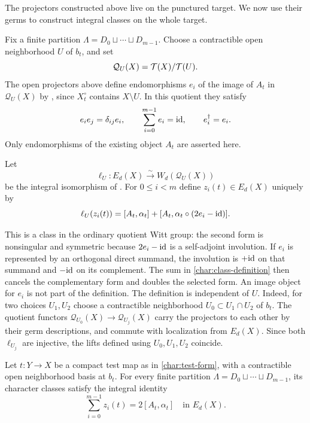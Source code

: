 The projectors constructed above live on the punctured target. We now
use their germs to construct integral classes on the whole target.

Fix a finite partition
$\Lambda=D_0\sqcup\cdots\sqcup D_{m-1}$.
Choose a contractible open neighborhood $U$ of $b_t$, and set
\[
 \mathcal Q_U(X)=\mathcal T(X)/\mathcal T(U).
\]
The open projectors above define endomorphisms $e_i$ of the image of
$A_t$ in $\mathcal Q_U(X)$ by , since
$X_t^\circ$ contains $X\setminus U$.  In this quotient they satisfy
\begin{equation}\label{char:projector-identities}
 e_i e_j=\delta_{ij}e_i,\qquad
 \sum_{i=0}^{m-1}e_i=\mathrm{id},\qquad e_i^\dagger=e_i.
\end{equation}
Only endomorphisms of the existing object $A_t$ are asserted here.

\begin{definition}\label{def:character-classes}
Let
\[
 \ell_U:E_d(X)\xrightarrow{\sim}W_d(\mathcal Q_U(X))
\]
be the integral isomorphism of .
For $0\leq i<m$ define $z_i(t)\in E_d(X)$ uniquely by
\begin{equation}\label{char:class-definition}
 \ell_U(z_i(t))=
 [A_t,\alpha_t]+[A_t,\alpha_t\circ(2e_i-\mathrm{id})].
\end{equation}
\end{definition}

This is a class in the ordinary quotient Witt group: the second form
is nonsingular and symmetric because $2e_i-\mathrm{id}$ is a self-adjoint
involution.  If $e_i$ is represented by an orthogonal direct summand,
the involution is $+\mathrm{id}$ on that summand and $-\mathrm{id}$ on its complement.
The sum in \eqref{char:class-definition} then cancels the complementary
form and doubles the selected form.  An image object for $e_i$ is not
part of the definition.
The definition is independent of $U$.  Indeed, for two choices $U_1,U_2$
choose a contractible neighborhood $U_0\subset U_1\cap U_2$ of $b_t$.
The quotient functors $\mathcal Q_{U_0}(X)\to\mathcal Q_{U_j}(X)$
carry the projectors to each other by their germ descriptions, and
commute with localization from $E_d(X)$.  Since both $\ell_{U_j}$
are injective, the lifts defined using $U_0,U_1,U_2$ coincide.

\begin{proposition}\label{prop:sum-classes}
Let $t:Y\to X$ be a compact test map as in \eqref{char:test-form},
with a contractible open neighborhood basis at $b_t$. For every finite
partition $\Lambda=D_0\sqcup\cdots\sqcup D_{m-1}$, its character
classes satisfy the integral identity
\begin{equation}\label{char:class-sum}
 \sum_{i=0}^{m-1}z_i(t)=2[A_t,\alpha_t]\quad\text{in }E_d(X).
\end{equation}
\end{proposition}

